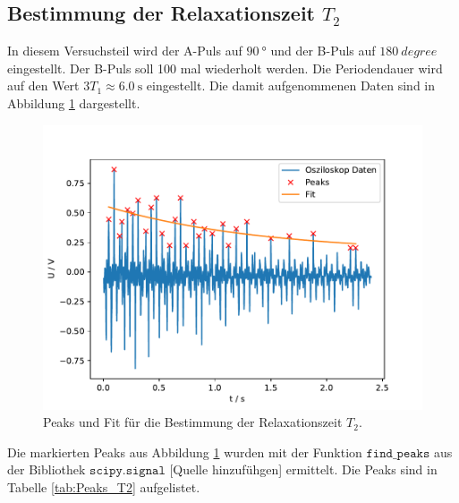 \subsection{Bestimmung der Relaxationszeit $T_{\text{2}}$}
In diesem Versuchsteil wird der A-Puls auf $\SI{90}{\degree}$ und der B-Puls auf $\SI{180}{degree}$ eingestellt. Der B-Puls
soll 100 mal wiederholt werden.
Die Periodendauer wird auf den Wert $3T_{\text{1}}\approx \SI{6.0}{\second}$ eingestellt. Die damit aufgenommenen Daten sind in 
Abbildung \ref{fig:T2_Data_Fit} dargestellt.
\begin{figure}
  \centering
  \includegraphics[width = \textwidth , keepaspectratio]{figure/T2_Data_Fit.pdf}
  \caption{Peaks und Fit für die Bestimmung der Relaxationszeit $T_{\text{2}}$.}
  \label{fig:T2_Data_Fit}
\end{figure}
Die markierten Peaks aus Abbildung \ref{fig:T2_Data_Fit} wurden mit der Funktion $\texttt{find\_peaks}$ aus der Bibliothek
$\texttt{scipy.signal}$ [Quelle hinzufühgen] ermittelt.
Die Peaks sind in Tabelle \ref{tab:Peaks_T2} aufgelistet.
